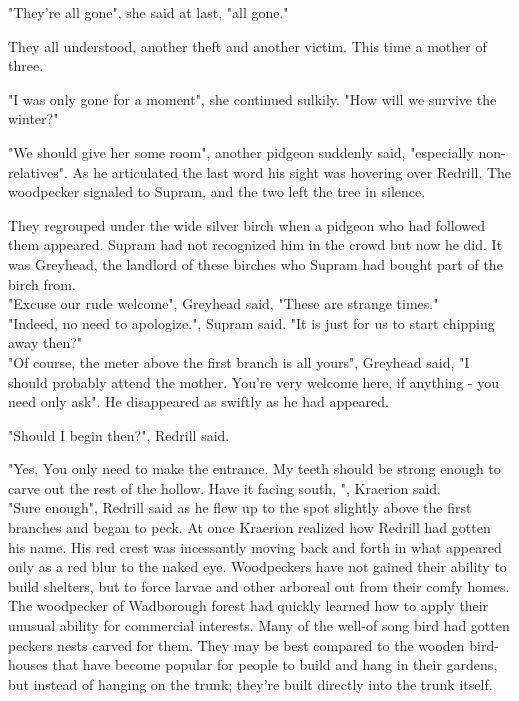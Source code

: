 \documentclass[smalldemyvopaper,11pt,twoside,onecolumn,openright,extrafontsizes]{memoir}
\begin{document}
"They're all gone", she said at last, "all gone."

They all understood, another theft and another victim. This time a mother of three. 

"I was only gone for a moment", she continued sulkily. "How will we survive the winter?"

"We should give her some room", another pidgeon suddenly said, "especially non-relatives". As he articulated the last word his sight was hovering over Redrill. The woodpecker signaled to Supram, and the two left the tree in silence.

They regrouped under the wide silver birch when a pidgeon who had followed them appeared. Supram had not recognized him in the crowd but now he did. It was Greyhead, the landlord of these birches who Supram had bought part of the birch from. \\

"Excuse our rude welcome", Greyhead said, "These are strange times."\\

"Indeed, no need to apologize.", Supram said. "It is just for us to start chipping away then?"\\

"Of course, the meter above the first branch is all yours", Greyhead said, "I should probably attend the mother. You're very welcome here, if anything - you need only ask". He disappeared as swiftly as he had appeared.

"Should I begin then?", Redrill said.

"Yes, You only need to make the entrance. My teeth should be strong enough to carve out the rest of the hollow. Have it facing south, ", Kraerion said.\\

"Sure enough", Redrill said as he flew up to the spot slightly above the first branches and began to peck. At once Kraerion realized how Redrill had gotten his name. His red crest was incessantly moving back and forth in what appeared only as a red blur to the naked eye. Woodpeckers have not gained their ability to build shelters, but to force larvae and other arboreal out from their comfy homes. The woodpecker of Wadborough forest had quickly learned how to apply their unusual ability for commercial interests. Many of the well-of song bird had gotten peckers nests carved for them. They may be best compared to the wooden bird-houses that have become popular for people to build and hang in their gardens, but instead of hanging on the trunk; they're built directly into the trunk itself.
\end{document}
